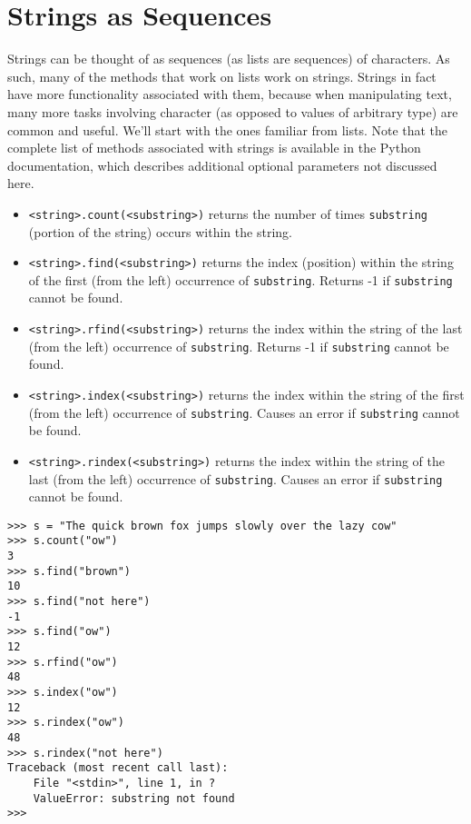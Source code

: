 \section{Strings as Sequences}

Strings can be thought of as sequences (as lists are sequences) of   characters. As such, many of the methods that work on lists work on   strings. Strings in fact have more functionality associated with them,   because when manipulating text, many more tasks   involving character (as opposed to values of arbitrary type) are common   and useful. We'll start with the ones familiar from lists. Note that   the complete list of methods associated with strings is available in the Python   documentation, which describes additional optional parameters not   discussed here.
\begin{itemize}
	\item 
\texttt{<string>.count(<substring>)} returns    the number of times \texttt{substring} (portion of the string) occurs within the string.
	\item 
\texttt{<string>.find(<substring>)} returns the    index (position) within the string of the first (from the left) occurrence of    \texttt{substring}. Returns -1 if \texttt{substring} cannot be found.
	\item 
\texttt{<string>.rfind(<substring>)} returns    the index within the string of the last (from the left) occurrence    of \texttt{substring}. Returns -1 if \texttt{substring} cannot be found.
	\item 
\texttt{<string>.index(<substring>)} returns    the index within the string of the first (from the left) occurrence    of \texttt{substring}. Causes an error if \texttt{substring} cannot be found.
	\item 
\texttt{<string>.rindex(<substring>)} returns    the index within the string of the last (from the left) occurrence    of \texttt{substring}. Causes an error if \texttt{substring} cannot be found.
\end{itemize}
\lstset{keywordstyle=\ttfamily}
\begin{lstlisting}
>>> s = "The quick brown fox jumps slowly over the lazy cow"
>>> s.count("ow")
3
>>> s.find("brown")
10
>>> s.find("not here")
-1
>>> s.find("ow")
12
>>> s.rfind("ow")
48
>>> s.index("ow")
12
>>> s.rindex("ow")
48
>>> s.rindex("not here")
Traceback (most recent call last):
    File "<stdin>", line 1, in ?
    ValueError: substring not found
>>>
\end{lstlisting}
\lstset{keywordstyle=\textbf}

